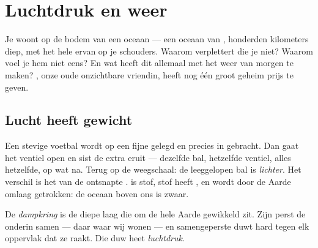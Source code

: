 \chapter{Luchtdruk en weer}\label{ch:g5:air-pressure-weather}

Je woont op de bodem van een oceaan --- een oceaan van ,
honderden kilometers diep, met het hele  ervan op je
schouders. Waarom verplettert die je niet? Waarom voel je hem niet
eens? En wat heeft dit allemaal met het weer van morgen te maken?
, onze oude onzichtbare vriendin, heeft nog één groot geheim
prijs te geven.

\section{Lucht heeft gewicht}

\begin{example}\label{ex:g5:air-pressure-weather:weighing}
Een stevige voetbal wordt op een fijne  gelegd en
precies in  gebracht. Dan gaat het ventiel open en sist de
extra  eruit --- dezelfde bal, hetzelfde ventiel, alles hetzelfde,
op wat  na. Terug op de weegschaal: de leeggelopen bal is
\emph{lichter}. Het verschil is het  van de ontsnapte
.  is stof, stof heeft , en  wordt door de
Aarde omlaag getrokken: de oceaan boven ons is zwaar.
\end{example}

\begin{definition}\label{def:g5:air-pressure-weather:pressure}
De \emph{dampkring} is de diepe laag  die om de
hele Aarde gewikkeld zit. Zijn  perst de  onderin samen
--- daar waar wij wonen --- en samengeperste  duwt hard tegen elk
oppervlak dat ze raakt. Die duw heet
\emph{luchtdruk}.
\end{definition}

